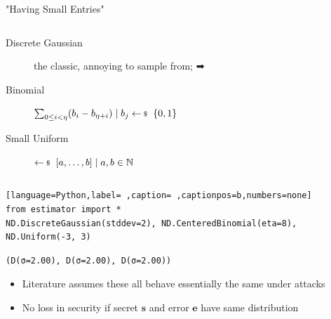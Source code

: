 \documentclass[table,10pt,aspectratio=169]{beamer}
\renewcommand{\vec}[1]{\ensuremath{\mathbf{#1}}\xspace}
\begin{document}
\begin{frame}[label={sec:org8090fa8},fragile]{"Having Small Entries"}
 \begin{columns}
\begin{column}{0.5\columnwidth}
\begin{description}
\item[{Discrete Gaussian}] the classic, annoying to sample from; ➡
\item[{Binomial}] \(\sum_{0 \leq i < \eta} (b_{i} - b_{\eta+i}) \mid b_{j} \sample \bin\)
\item[{Small Uniform}] \(\sample [a,\ldots,b] \mid a,b \in \NN\)
\end{description}
\end{column}

\begin{column}{0.5\columnwidth}
\end{column}
\end{columns}

\begin{lstlisting}[language=Python,label= ,caption= ,captionpos=b,numbers=none]
from estimator import *
ND.DiscreteGaussian(stddev=2), ND.CenteredBinomial(eta=8), ND.Uniform(-3, 3)
\end{lstlisting}

\begin{verbatim}
(D(σ=2.00), D(σ=2.00), D(σ=2.00))
\end{verbatim}


\begin{itemize}
\item Literature assumes these all behave essentially the same under attacks
\item No loss in security if secret \(\vec{s}\) and error \(\vec{e}\) have same distribution \cite{C:ACPS09}
\end{itemize}
\end{frame}
\end{document}
